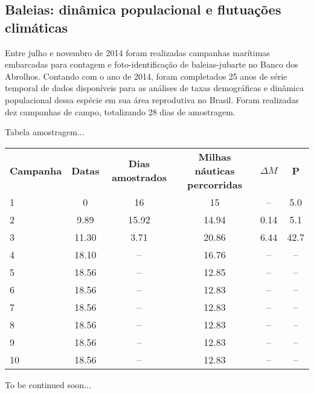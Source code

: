 \subsection{Baleias: dinâmica populacional e flutuações climáticas} %
\label{sec:dinam-popul-de} 

Entre julho e novembro de 2014 foram realizadas campanhas marítimas embarcadas para contagem e foto-identificação de baleias-jubarte no Banco dos Abrolhos. Contando com o ano de 2014, foram completados 25 anos de série temporal de dados disponíveis para as análises de taxas demográficas e dinâmica populacional dessa espécie em sua área reprodutiva no Brasil. Foram realizadas dez campanhas de campo, totalizando 28 dias de amostragem.


Tabela amostragem...
\begin{tabular}{lccccc}
  \textbf{Campanha}        & \textbf{Datas} & \textbf{Dias amostrados}  & \textbf{Milhas náuticas percorridas} &  \textbf{$\Delta M$} & \textbf{P} \\   
    1   & 0      & 16     & 15    & --   & 5.0   \\            
    2   & 9.89   & 15.92  & 14.94 & 0.14 & 5.1   \\
    3   & 11.30  &  3.71  & 20.86 & 6.44 & 42.7  \\
    4   & 18.10  & --     & 16.76 &  --  & --    \\
    5   & 18.56  & --     & 12.85 &  --  & --    \\    
    6   & 18.56  & --     & 12.83 &  --  & --    \\
    7   & 18.56  & --     & 12.83 &  --  & --    \\
    8   & 18.56  & --     & 12.83 &  --  & --    \\
    9   & 18.56  & --     & 12.83 &  --  & --    \\
    10   & 18.56  & --     & 12.83 &  --  & --    \\
    
  \end{tabular}
  
  To be continued soon...